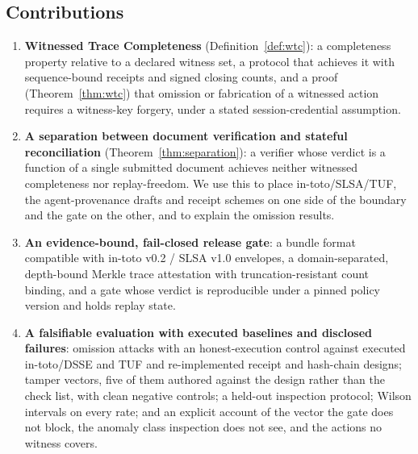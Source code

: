 \subsection{Contributions}
\begin{enumerate}
  \item \textbf{Witnessed Trace Completeness} (Definition~\ref{def:wtc}): a
  completeness property relative to a declared witness set, a protocol that
  achieves it with sequence-bound receipts and signed closing counts, and a
  proof (Theorem~\ref{thm:wtc}) that omission or fabrication of a witnessed
  action requires a witness-key forgery, under a stated session-credential
  assumption.
  \item \textbf{A separation between document verification and stateful
  reconciliation} (Theorem~\ref{thm:separation}): a verifier whose verdict is a
  function of a single submitted document achieves neither witnessed
  completeness nor replay-freedom. We use this to place in-toto/SLSA/TUF, the
  agent-provenance drafts and receipt schemes on one side of the boundary and
  the gate on the other, and to explain the omission results.
  \item \textbf{An evidence-bound, fail-closed release gate}: a bundle format
  compatible with in-toto v0.2 / SLSA v1.0 envelopes, a domain-separated,
  depth-bound Merkle trace attestation with truncation-resistant count binding,
  and a gate whose verdict is reproducible under a pinned policy version and
  holds replay state.
  \item \textbf{A falsifiable evaluation with executed baselines and disclosed
  failures}: \omVectors{} omission attacks with an honest-execution control
  against executed in-toto/DSSE and TUF and re-implemented receipt and
  hash-chain designs; \scoredVectors{} tamper vectors, five of them authored
  against the design rather than the check list, with clean negative controls;
  a held-out inspection protocol; Wilson intervals on every rate; and an
  explicit account of the vector the gate does not block, the anomaly class
  inspection does not see, and the actions no witness covers.
\end{enumerate}

